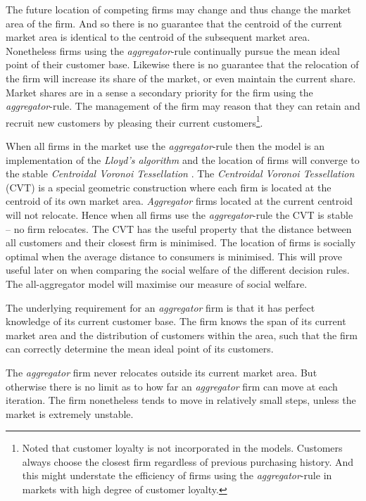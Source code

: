 \documentclass[preprint, 12pt]{elsarticle}
\begin{document}
The future location of competing firms may change and thus change the market area of the firm. And so there is no guarantee that the centroid of the current market area is identical to the centroid of the subsequent market area. Nonetheless firms using the \emph{aggregator}-rule continually pursue the mean ideal point of their customer base. Likewise there is no guarantee that the relocation of the firm will increase its share of the market, or even maintain the current share. Market shares are in a sense a secondary priority for the firm using the \emph{aggregator}-rule. The management of the firm may reason that they can retain and recruit new customers by pleasing their current customers\footnote{Noted that customer loyalty is not incorporated in the models. Customers always choose the closest firm regardless of previous purchasing history. And this might understate the efficiency of firms using the \emph{aggregator}-rule in markets with high degree of customer loyalty.}.

When all firms in the market use the \emph{aggregator}-rule then the model is an implementation of the \emph{Lloyd's algorithm} and the location of firms will converge to the stable \emph{Centroidal Voronoi Tessellation} \citep[chapter~3, pp.~48-49]{Laver_Sergenti_2011}. The \emph{Centroidal Voronoi Tessellation} (CVT) is a special geometric construction where each firm is located at the centroid of its own market area. \emph{Aggregator} firms located at the current centroid will not relocate. Hence when all firms use the \emph{aggregator}-rule the CVT is stable -- no firm relocates. The CVT has the useful property that the distance between all customers and their closest firm is minimised. The location of firms is socially optimal when the average distance to consumers is minimised. This will prove useful later on when comparing the social welfare of the different decision rules. The all-aggregator model will maximise our measure of social welfare.

The underlying requirement for an \emph{aggregator} firm is that it has perfect knowledge of its current customer base. The firm knows the span of its current market area and the distribution of customers within the area, such that the firm can correctly determine the mean ideal point of its customers.

The \emph{aggregator} firm never relocates outside its current market area. But otherwise there is no limit as to how far an \emph{aggregator} firm can move at each iteration. The firm nonetheless tends to move in relatively small steps, unless the market is extremely unstable. 
\end{document}
